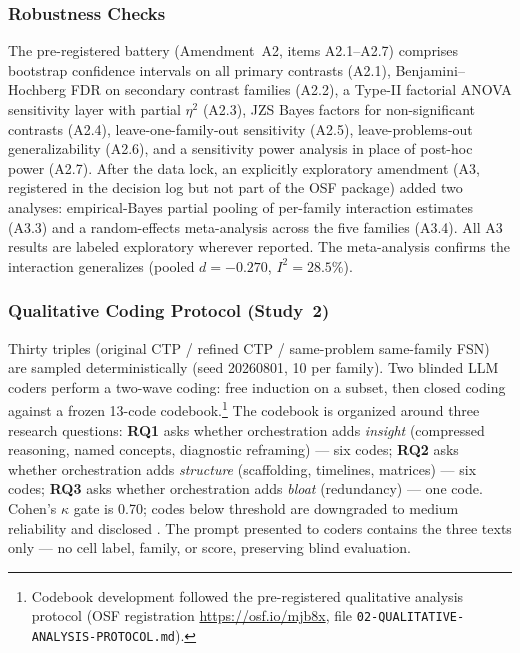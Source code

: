 \documentclass[12pt,a4paper]{article}
\begin{document}
\subsubsection{Robustness Checks}

The pre-registered battery (Amendment~A2, items A2.1--A2.7) comprises
bootstrap confidence intervals on all primary contrasts (A2.1),
Benjamini--Hochberg FDR on secondary contrast families (A2.2), a Type-II
factorial ANOVA sensitivity layer with partial $\eta^2$ (A2.3), JZS Bayes
factors for non-significant contrasts (A2.4), leave-one-family-out
sensitivity (A2.5), leave-problems-out generalizability (A2.6), and a
sensitivity power analysis in place of post-hoc power (A2.7). After the data
lock, an explicitly exploratory amendment (A3, registered in the decision log
but not part of the OSF package) added two analyses: empirical-Bayes partial
pooling of per-family interaction estimates (A3.3) and a random-effects
meta-analysis across the five families (A3.4). All A3 results are labeled
exploratory wherever reported. The meta-analysis confirms the interaction
generalizes (pooled $d = -0.270$, $I^2 = 28.5\%$).

\subsubsection{Qualitative Coding Protocol (Study~2)}\label{sec:qual-coding}

Thirty triples (original CTP / refined CTP / same-problem same-family FSN) are
sampled deterministically (seed 20260801, 10 per family). Two blinded LLM coders
perform a two-wave coding: free induction on a subset, then closed coding
against a frozen 13-code codebook.\footnote{Codebook development followed the
pre-registered qualitative analysis protocol (OSF registration
\url{https://osf.io/mjb8x}, file \texttt{02-QUALITATIVE-ANALYSIS-PROTOCOL.md}).} The codebook is organized
around three research questions: \textbf{RQ1} asks whether orchestration adds
\emph{insight} (compressed reasoning, named concepts, diagnostic reframing) ---
six codes; \textbf{RQ2} asks whether orchestration adds \emph{structure}
(scaffolding, timelines, matrices) --- six codes; \textbf{RQ3} asks whether
orchestration adds \emph{bloat} (redundancy) --- one code. Cohen's $\kappa$ gate is 0.70; codes below threshold
are downgraded to medium reliability and disclosed \citep{Cohen1960}. The prompt
presented to coders contains the three texts only --- no cell label, family, or
score, preserving blind evaluation.
\end{document}
